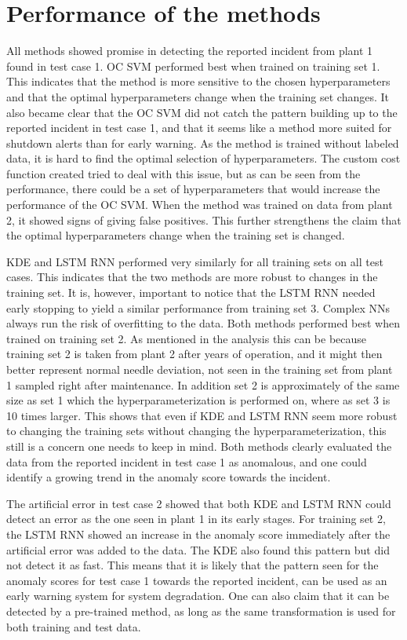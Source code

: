 \section{Performance of the methods}
    All methods showed promise in detecting the reported incident from plant 1 found in test case 1. OC SVM performed best when trained on training set 1. This indicates that the method is more sensitive to the chosen hyperparameters and that the optimal hyperparameters change when the training set changes. It also became clear that the OC SVM did not catch the pattern building up to the reported incident in test case 1, and that it seems like a method more suited for shutdown alerts than for early warning. As the method is trained without labeled data, it is hard to find the optimal selection of hyperparameters. The custom cost function created tried to deal with this issue, but as can be seen from the performance, there could be a set of hyperparameters that would increase the performance of the OC SVM. When the method was trained on data from plant 2, it showed signs of giving false positives. This further strengthens the claim that the optimal hyperparameters change when the training set is changed. 
    
    KDE and LSTM RNN performed very similarly for all training sets on all test cases. This indicates that the two methods are more robust to changes in the training set. It is, however, important to notice that the LSTM RNN needed early stopping to yield a similar performance from training set 3. Complex NNs always run the risk of overfitting to the data. Both methods performed best when trained on training set 2. As mentioned in the analysis this can be because training set 2 is taken from plant 2 after years of operation, and it might then better represent normal needle deviation, not seen in the training set from plant 1 sampled right after maintenance. In addition set 2 is approximately of the same size as set 1 which the hyperparameterization is performed on, where as set 3 is 10 times larger. This shows that even if KDE and LSTM RNN seem more robust to changing the training sets without changing the hyperparameterization, this still is a concern one needs to keep in mind. Both methods clearly evaluated the data from the reported incident in test case 1 as anomalous, and one could identify a growing trend in the anomaly score towards the incident.   
    
    The artificial error in test case 2 showed that both KDE and LSTM RNN could detect an error as the one seen in plant 1 in its early stages. For training set 2, the LSTM RNN showed an increase in the anomaly score immediately after the artificial error was added to the data. The KDE also found this pattern but did not detect it as fast. This means that it is likely that the pattern seen for the anomaly scores for test case 1 towards the reported incident, can be used as an early warning system for system degradation. One can also claim that it can be detected by a pre-trained method, as long as the same transformation is used for both training and test data.  
    
